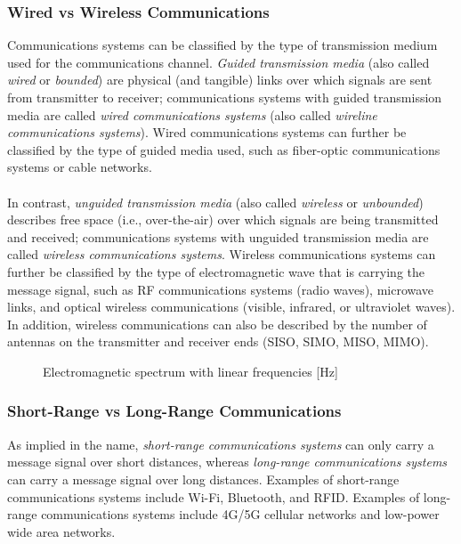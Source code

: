 \documentclass{report}
\begin{document}
\subsubsection{Wired vs Wireless Communications}
Communications systems can be classified by the type of transmission medium used for the communications channel. \emph{Guided transmission media} (also called \emph{wired} or \emph{bounded}) 
are physical (and tangible) links over which signals are sent from transmitter to receiver; communications systems with guided transmission media are called \emph{wired communications systems} (also called 
\emph{wireline communications systems}). Wired communications systems can further be classified by the type of guided media used, such as fiber-optic communications systems or cable networks. 
\\ \\
In contrast, \emph{unguided transmission media} (also called \emph{wireless} or \emph{unbounded}) describes free space (i.e., over-the-air) over which signals are being transmitted and received; 
communications systems with unguided transmission media are called \emph{wireless communications systems}. Wireless communications systems can further be classified by the type of electromagnetic wave that 
is carrying the message signal, such as RF communications systems (radio waves), microwave links, and optical wireless communications (visible, infrared, or ultraviolet waves). In addition, wireless 
communications can also be described by the number of antennas on the transmitter and receiver ends (SISO, SIMO, MISO, MIMO).

\begin{figure}
    \centering
    \caption{Electromagnetic spectrum with linear frequencies [Hz]}
    \resizebox{0.95\textwidth}{!}{%
        
    }
\end{figure}

\subsubsection{Short-Range vs Long-Range Communications}
As implied in the name, \emph{short-range communications systems} can only carry a message signal over short distances, whereas \emph{long-range communications systems} can carry a message signal over 
long distances. Examples of short-range communications systems include Wi-Fi, Bluetooth, and RFID. Examples of long-range communications systems include 4G/5G cellular networks and low-power wide area networks.
\end{document}
